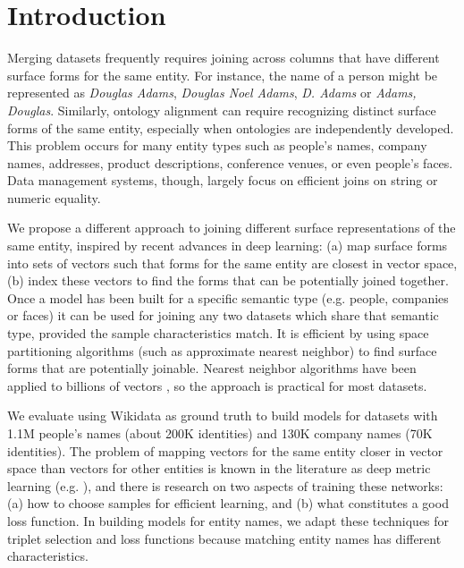 \section{Introduction}

Merging datasets frequently requires joining across columns that have
different surface forms for the same entity.  For instance, the name of a person might be represented as \textit{Douglas Adams}, \textit{Douglas Noel Adams}, \textit{D. Adams} or \textit{Adams, Douglas}.  Similarly, ontology alignment can require recognizing distinct surface forms of
the same entity, especially when ontologies are independently
developed.  This problem occurs for many entity types such as people's names, company names, addresses, product descriptions, conference venues, or even people's faces.  Data management systems, though, largely focus on efficient joins on string or numeric equality.

We propose a different approach to joining different surface representations of the same entity, inspired by recent advances in deep learning: (a) map surface forms into sets of vectors such that forms for the same entity are closest in vector space, (b) index these vectors to find the forms that can be potentially joined together.  Once a model has been built for a specific semantic type (e.g. people, companies or faces) it can be used for joining any two datasets which share that semantic type, provided the sample characteristics match.  It is efficient by using space partitioning algorithms (such as approximate nearest neighbor) to find surface forms that are potentially joinable.  Nearest neighbor algorithms have been applied to billions of vectors \cite{JDH17}, so the approach is practical for most datasets.  

We evaluate using Wikidata as ground truth to build models for datasets with 1.1M people's names (about 200K identities) and 130K company names (70K identities).  The problem of mapping vectors for the same entity closer in vector space than vectors for other entities is known in the literature as deep metric learning (e.g. \cite{DBLP:conf/cvpr/SchroffKP15}), and there is research on two aspects of training these networks: (a) how to choose samples for efficient learning, and (b) what constitutes a good loss function.  In building models for entity names, we adapt these techniques for triplet selection and loss functions because matching entity names has different characteristics.

